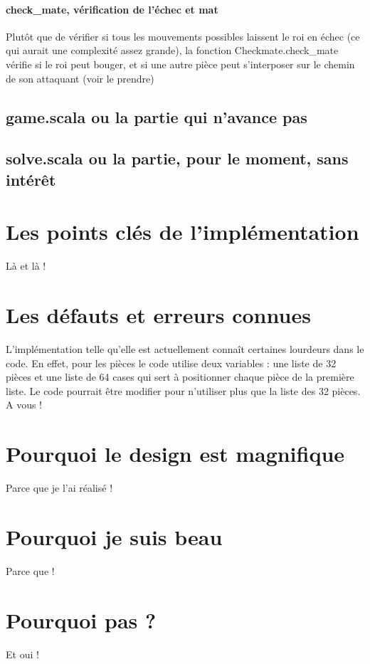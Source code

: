 \documentclass[a4paper]{article}
\begin{document}
\paragraph {check_mate, vérification de l'échec et mat} Plutôt que de vérifier si tous les mouvements possibles laissent le roi en échec (ce qui aurait une complexité assez grande), la fonction Checkmate.check_mate vérifie si le roi peut bouger, et si une autre pièce peut s'interposer sur le chemin de son attaquant (voir le prendre)


\subsection{game.scala ou la partie qui n'avance pas}

\subsection{solve.scala ou la partie, pour le moment, sans intérêt}

\section{Les points clés de l'implémentation}

Là et là !

\section{Les défauts et erreurs connues}

L'implémentation telle qu'elle est actuellement connaît certaines lourdeurs dans le code. En effet, pour les pièces le code utilise deux variables : une liste de 32 pièces et une liste de 64 cases qui sert à positionner chaque pièce de la première liste. Le code pourrait être modifier pour n'utiliser plus que la liste des 32 pièces. \\

A vous !

\section{Pourquoi le design est magnifique}

Parce que je l'ai réalisé !

\section{Pourquoi je suis beau}

Parce que !

\section{Pourquoi pas ?}

Et oui !
\end{document}
